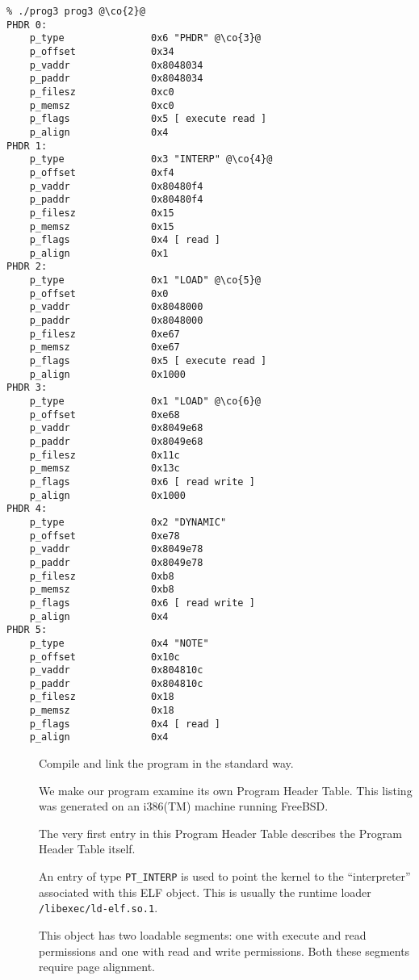\documentclass[a4paper]{report}
\makeatletter
\newcommand{\constant}[1]{\texttt{#1}}
\newcommand{\filename}[1]{\texttt{#1}}
\newcommand{\trade}{(TM)\xspace}
\newenvironment{callout}[2][blue]{%
  \begingroup\newcommand{\@cocolor}{#1}%
  \newcommand{\@cogroup}[1]{#2}}{\endgroup}
\newcommand{\@co}[1]{\framebox{\textbf{\color{\@cocolor}#1}}}
\newcommand{\co}[1]{%
  \hypertarget{\@cogroup.#1.co}{%
    \hyperlink{\@cogroup.#1.cr}{\@co{#1}}}}
\newcommand{\coref}[1]{%
  \hypertarget{\@cogroup.#1.cr}{%
    \hyperlink{\@cogroup.#1.co}{\@co{#1}}}}
\makeatother
\begin{document}
\begin{callout}[red]{scr3}
  \begin{lstlisting}[language={}, basicstyle=\small\ttfamily,
      label=scr.prog3, caption=Compiling and Running prog3]
% cc -o prog3 prog3.c -lelf @\co{1}@
% ./prog3 prog3 @\co{2}@
PHDR 0:
    p_type               0x6 "PHDR" @\co{3}@
    p_offset             0x34
    p_vaddr              0x8048034
    p_paddr              0x8048034
    p_filesz             0xc0
    p_memsz              0xc0
    p_flags              0x5 [ execute read ]
    p_align              0x4
PHDR 1:
    p_type               0x3 "INTERP" @\co{4}@
    p_offset             0xf4
    p_vaddr              0x80480f4
    p_paddr              0x80480f4
    p_filesz             0x15
    p_memsz              0x15
    p_flags              0x4 [ read ]
    p_align              0x1
PHDR 2:
    p_type               0x1 "LOAD" @\co{5}@
    p_offset             0x0
    p_vaddr              0x8048000
    p_paddr              0x8048000
    p_filesz             0xe67
    p_memsz              0xe67
    p_flags              0x5 [ execute read ]
    p_align              0x1000
PHDR 3:
    p_type               0x1 "LOAD" @\co{6}@
    p_offset             0xe68
    p_vaddr              0x8049e68
    p_paddr              0x8049e68
    p_filesz             0x11c
    p_memsz              0x13c
    p_flags              0x6 [ read write ]
    p_align              0x1000
PHDR 4:
    p_type               0x2 "DYNAMIC"
    p_offset             0xe78
    p_vaddr              0x8049e78
    p_paddr              0x8049e78
    p_filesz             0xb8
    p_memsz              0xb8
    p_flags              0x6 [ read write ]
    p_align              0x4
PHDR 5:
    p_type               0x4 "NOTE"
    p_offset             0x10c
    p_vaddr              0x804810c
    p_paddr              0x804810c
    p_filesz             0x18
    p_memsz              0x18
    p_flags              0x4 [ read ]
    p_align              0x4
  \end{lstlisting}

  \begin{description}
  \item[\coref{1}] Compile and link the program in the standard way.
  \item[\coref{2}] We make our program examine its own Program Header
    Table.  This listing was generated on an i386\trade machine
    running FreeBSD.
  \item[\coref{3}] The very first entry in this Program Header Table
    describes the Program Header Table itself.
  \item[\coref{4}] An entry of type \constant{PT\_INTERP} is used to
    point the kernel to the ``interpreter'' associated with this ELF
    object.  This is usually the runtime loader
    \filename{/libexec/ld-elf.so.1}.
  \item[\coref{5} \coref{6}] This object has two loadable segments:
    one with execute and read permissions and one with read and write
    permissions.  Both these segments require page alignment.
  \end{description}
\end{callout}
\end{document}
